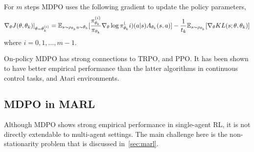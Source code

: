 For $m$ steps MDPO uses the following gradient to update the policy parameters, 
\begin{equation}
	\label{eqn:mdpograd}
	\nabla_{\theta} J(\theta, \theta_k)|_{\theta = \theta_k^{(i)}} = \mathbb{E}_{s \sim \rho_{\theta_k} \\ a \sim \theta_k} 
	[\frac{\pi_{\theta_k}^{(i)}}{\pi_{\theta_k}} \nabla_{\theta} \log \pi_{\theta_k}^(i) (a|s) A_{\theta_k}(s,a)] - 
	\frac{1}{t_k} \mathbb{E}_{s \sim \rho_{\theta_k}} [\nabla_\theta KL(s; \theta, \theta_k)]
\end{equation}
where $i=0,1,\ldots,m-1$.







On-policy MDPO has strong connections to TRPO, and PPO. It has been shown to have better empirical performance 
than the latter algorithms in continuous control tasks, and Atari environments.~\cite{tomarMirror2022}

\subsection{MDPO in MARL}
Although MDPO shows strong empirical performance in single-agent RL, it is not directly extendable to multi-agent settings.
The main challenge here is the non-stationarity problem that is discussed in~\ref{sec:marl}.

